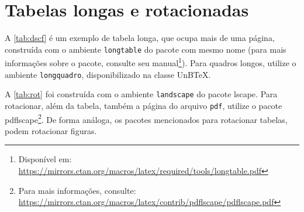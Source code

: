 \chapter{Tabelas longas e rotacionadas}\label{apd:tabs}

A \cref{tab:dscf} é um exemplo de tabela longa, que ocupa mais de uma página, construída com o ambiente \texttt{longtable} do pacote com mesmo nome (para mais informações sobre o pacote, consulte seu manual\footnote{Disponível em: \url{https://mirrors.ctan.org/macros/latex/required/tools/longtable.pdf}}). Para quadros longos, utilize o ambiente \texttt{longquadro}, disponibilizado na classe UnB\TeX. 

A \cref{tab:rot} foi construída com o ambiente \texttt{landscape} do pacote \textsf{lscape}. Para rotacionar, além da tabela, também a página do arquivo \texttt{pdf}, utilize o pacote \textsf{pdflscape}\footnote{Para mais informações, consulte: \url{https://mirrors.ctan.org/macros/latex/contrib/pdflscape/pdflscape.pdf}}. De forma análoga, os pacotes mencionados para rotacionar tabelas, podem rotacionar figuras.
  
